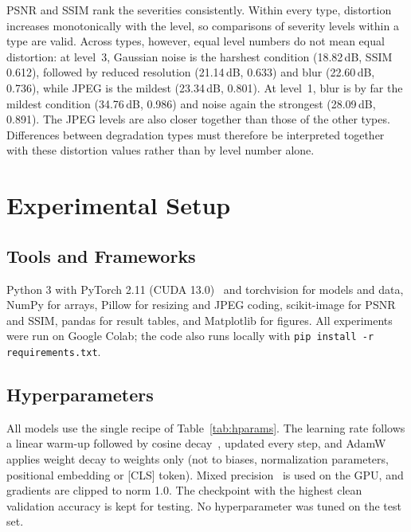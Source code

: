 \documentclass[conference]{IEEEtran}
\begin{document}
PSNR and SSIM rank the severities consistently. Within every type, distortion increases monotonically with the level, so comparisons of severity levels within a type are valid. Across types, however, equal level numbers do not mean equal distortion: at level~3, Gaussian noise is the harshest condition (18.82\,dB, SSIM 0.612), followed by reduced resolution (21.14\,dB, 0.633) and blur (22.60\,dB, 0.736), while JPEG is the mildest (23.34\,dB, 0.801). At level~1, blur is by far the mildest condition (34.76\,dB, 0.986) and noise again the strongest (28.09\,dB, 0.891). The JPEG levels are also closer together than those of the other types. Differences between degradation types must therefore be interpreted together with these distortion values rather than by level number alone.

\section{Experimental Setup}

\subsection{Tools and Frameworks}
Python 3 with PyTorch 2.11 (CUDA 13.0)~\cite{paszke2019} and torchvision for models and data, NumPy for arrays, Pillow for resizing and JPEG coding, scikit-image for PSNR and SSIM, pandas for result tables, and Matplotlib for figures. All experiments were run on Google Colab; the code also runs locally with \texttt{pip install -r requirements.txt}.

\subsection{Hyperparameters}
All models use the single recipe of Table~\ref{tab:hparams}. The learning rate follows a linear warm-up followed by cosine decay~\cite{loshchilov2017}, updated every step, and AdamW~\cite{loshchilov2019} applies weight decay to weights only (not to biases, normalization parameters, positional embedding or [CLS] token). Mixed precision~\cite{micikevicius2018} is used on the GPU, and gradients are clipped to norm 1.0. The checkpoint with the highest clean validation accuracy is kept for testing. No hyperparameter was tuned on the test set.
\end{document}
